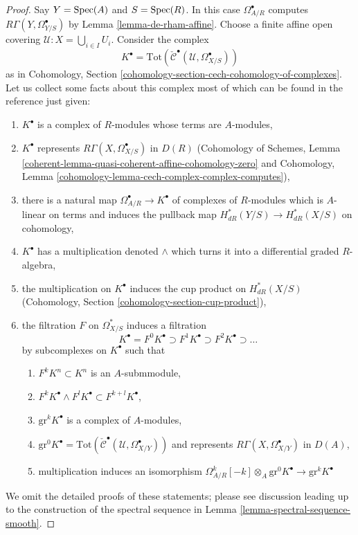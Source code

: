 \begin{proof}
Say $Y = \mathop{\mathrm{Spec}}(A)$ and $S = \mathop{\mathrm{Spec}}(R)$.
In this case $\Omega^\bullet_{A/R}$ computes
$R\Gamma(Y, \Omega^\bullet_{Y/S})$ by Lemma \ref{lemma-de-rham-affine}.
Choose a finite affine open covering $\mathcal{U} : X = \bigcup_{i \in I} U_i$.
Consider the complex
$$
K^\bullet =
\text{Tot}(\check{\mathcal{C}}^\bullet(\mathcal{U}, \Omega_{X/S}^\bullet))
$$
as in
Cohomology, Section \ref{cohomology-section-cech-cohomology-of-complexes}.
Let us collect some facts about this complex most of which
can be found in the reference just given:
\begin{enumerate}
\item $K^\bullet$ is a complex of $R$-modules whose terms are
$A$-modules,
\item $K^\bullet$ represents $R\Gamma(X, \Omega^\bullet_{X/S})$ in $D(R)$
(Cohomology of Schemes, Lemma
\ref{coherent-lemma-quasi-coherent-affine-cohomology-zero} and
Cohomology, Lemma \ref{cohomology-lemma-cech-complex-complex-computes}),
\item there is a natural map $\Omega^\bullet_{A/R} \to K^\bullet$
of complexes of $R$-modules which is $A$-linear on terms and
induces the pullback map $H^*_{dR}(Y/S) \to H^*_{dR}(X/S)$
on cohomology,
\item $K^\bullet$ has a multiplication denoted $\wedge$
which turns it into a differential graded $R$-algebra,
\item the multiplication on $K^\bullet$
induces the cup product on $H^*_{dR}(X/S)$
(Cohomology, Section \ref{cohomology-section-cup-product}),
\item the filtration $F$ on $\Omega^*_{X/S}$ induces a filtration
$$
K^\bullet =
F^0K^\bullet \supset F^1K^\bullet \supset F^2K^\bullet \supset \ldots
$$
by subcomplexes on $K^\bullet$ such that
\begin{enumerate}
\item $F^kK^n \subset K^n$ is an $A$-submmodule,
\item $F^kK^\bullet \wedge F^lK^\bullet \subset F^{k + l}K^\bullet$,
\item $\text{gr}^kK^\bullet$ is a complex of $A$-modules,
\item $\text{gr}^0K^\bullet =
\text{Tot}(\check{\mathcal{C}}^\bullet(\mathcal{U}, \Omega_{X/Y}^\bullet))$
and represents $R\Gamma(X, \Omega^\bullet_{X/Y})$ in $D(A)$,
\item multiplication induces an isomorphism
$\Omega^k_{A/R}[-k] \otimes_A \text{gr}^0K^\bullet \to \text{gr}^kK^\bullet$
\end{enumerate}
\end{enumerate}
We omit the detailed proofs of these statements; please see discussion
leading up to the construction of the spectral sequence in
Lemma \ref{lemma-spectral-sequence-smooth}.


\end{proof}
